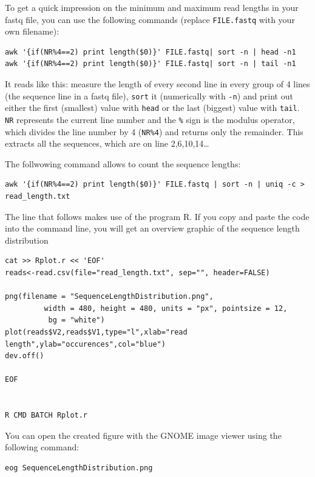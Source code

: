 \documentclass[11pt]{article}
\begin{document}
To get a quick impression on the minimum and maximum read lengths in
your fastq file, you can use the following commands (replace
\texttt{FILE.fastq} with your own filename):

\begin{verbatim}
awk '{if(NR%4==2) print length($0)}' FILE.fastq| sort -n | head -n1
awk '{if(NR%4==2) print length($0)}' FILE.fastq| sort -n | tail -n1
\end{verbatim}

It reads like this: measure the length of every second line in every
group of 4 lines (the sequence line in a fastq file), \texttt{sort} it
(numerically with \texttt{-n}) and print out either the first (smallest)
value with \texttt{head} or the last (biggest) value with \texttt{tail}. \texttt{NR}
represents the current line number and the \texttt{\%} sign is the modulus
operator, which divides the line number by 4 (\texttt{NR\%4}) and returns only
the remainder. This extracts all the sequences, which are on line
2,6,10,14\ldots{}


The follwowing command allows to count the sequence lengths:

\begin{verbatim}
awk '{if(NR%4==2) print length($0)}' FILE.fastq | sort -n | uniq -c > read_length.txt
\end{verbatim}

The line that follows makes use of the program R. If you copy and
paste the code into the command line, you will get an overview graphic
of the sequence length distribution 

\begin{verbatim}
cat >> Rplot.r << 'EOF'
reads<-read.csv(file="read_length.txt", sep="", header=FALSE)

png(filename = "SequenceLengthDistribution.png",
         width = 480, height = 480, units = "px", pointsize = 12,
          bg = "white")
plot(reads$V2,reads$V1,type="l",xlab="read length",ylab="occurences",col="blue")
dev.off()

EOF


R CMD BATCH Rplot.r
\end{verbatim}

You can open the created figure with the GNOME image viewer using the
following command:

\begin{verbatim}
eog SequenceLengthDistribution.png
\end{verbatim}
\end{document}
